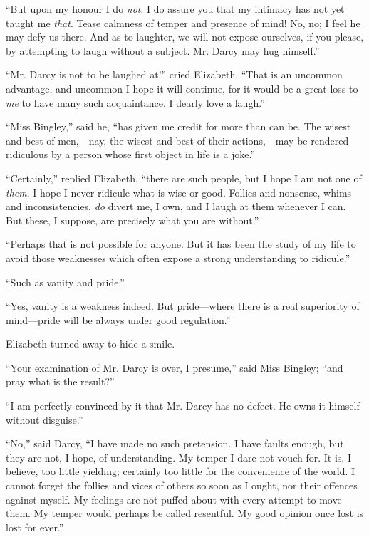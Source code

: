 ``But upon my honour I do \textit{not}. I do assure you that my intimacy has not yet taught me \textit{that}. Tease calmness of temper and presence of mind! No, no; I feel he may defy us there. And as to laughter, we will not expose ourselves, if you please, by attempting to laugh without a subject. Mr. Darcy may hug himself.''

``Mr. Darcy is not to be laughed at!'' cried Elizabeth. ``That is an uncommon advantage, and uncommon I hope it will continue, for it would be a great loss to \textit{me} to have many such acquaintance. I dearly love a laugh.''

``Miss Bingley,'' said he, ``has given me credit for more than can be. The wisest and best of men,---nay, the wisest and best of their actions,---may be rendered ridiculous by a person whose first object in life is a joke.''

``Certainly,'' replied Elizabeth, ``there are such people, but I hope I am not one of \textit{them}. I hope I never ridicule what is wise or good. Follies and nonsense, whims and inconsistencies, \textit{do} divert me, I own, and I laugh at them whenever I can. But these, I suppose, are precisely what you are without.''

``Perhaps that is not possible for anyone. But it has been the study of my life to avoid those weaknesses which often expose a strong understanding to ridicule.''

``Such as vanity and pride.''

``Yes, vanity is a weakness indeed. But pride---where there is a real superiority of mind---pride will be always under good regulation.''

Elizabeth turned away to hide a smile.

``Your examination of Mr. Darcy is over, I presume,'' said Miss Bingley; ``and pray what is the result?''

``I am perfectly convinced by it that Mr. Darcy has no defect. He owns it himself without disguise.''

``No,'' said Darcy, ``I have made no such pretension. I have faults enough, but they are not, I hope, of understanding. My temper I dare not vouch for. It is, I believe, too little yielding; certainly too little for the convenience of the world. I cannot forget the follies and vices of others so soon as I ought, nor their offences against myself. My feelings are not puffed about with every attempt to move them. My temper would perhaps be called resentful. My good opinion once lost is lost for ever.''

